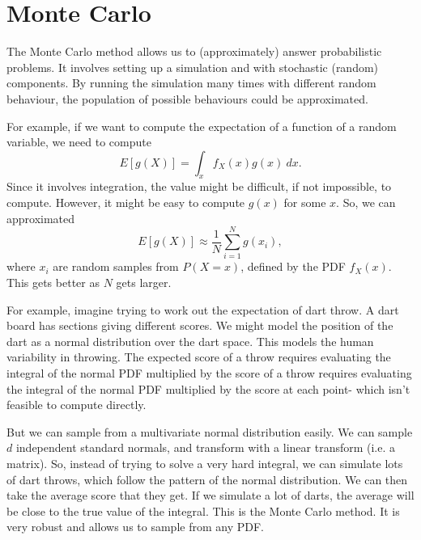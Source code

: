 \documentclass[a4paper, openany]{memoir}
\begin{document}

\section{Monte Carlo}
The Monte Carlo method allows us to (approximately) answer probabilistic problems. It involves setting up a simulation and with stochastic (random) components. By running the simulation many times with different random behaviour, the population of possible behaviours could be approximated.

For example, if we want to compute the expectation of a function of a random variable, we need to compute
\[E[g(X)] = \int_x f_X(x) g(x) \ dx.\]
Since it involves integration, the value might be difficult, if not impossible, to compute. However, it might be easy to compute $g(x)$ for some $x$. So, we can approximated
\[E[g(X)] \approx \frac{1}{N} \sum_{i=1}^N g(x_i),\]
where $x_i$ are random samples from $P(X = x)$, defined by the PDF $f_X(x)$. This gets better as $N$ gets larger.

For example, imagine trying to work out the expectation of dart throw. A dart board has sections giving different scores. We might model the position of the dart as a normal distribution over the dart space. This models the human variability in throwing. The expected score of a throw requires evaluating the integral of the normal PDF multiplied by the score of a throw requires evaluating the integral of the normal PDF multiplied by the score at each point- which isn't feasible to compute directly.

But we can sample from a multivariate normal distribution easily. We can sample $d$ independent standard normals, and transform with a linear transform (i.e. a matrix). So, instead of trying to solve a very hard integral, we can simulate lots of dart throws, which follow the pattern of the normal distribution. We can then take the average score that they get. If we simulate a lot of darts, the average will be close to the true value of the integral. This is the Monte Carlo method. It is very robust and allows us to sample from any PDF. 
\end{document}
